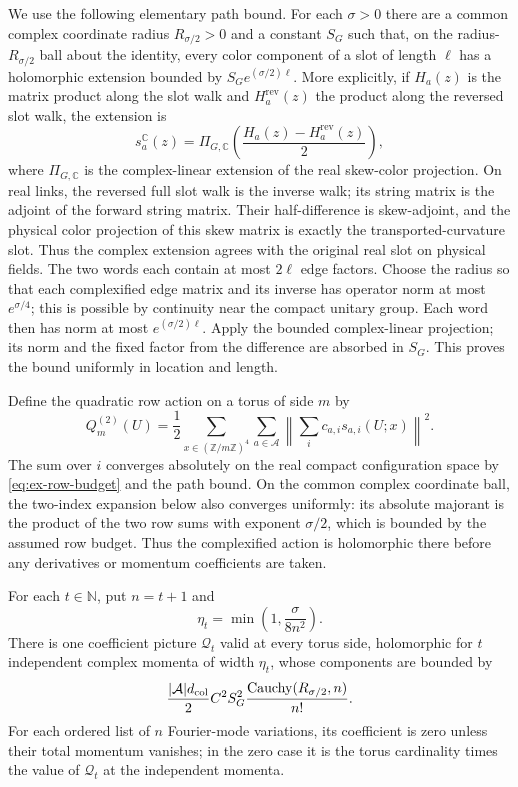 We use the following elementary path bound. For each $\sigma>0$ there are a
common complex coordinate radius $R_{\sigma/2}>0$ and a constant $S_G$ such
that, on the radius-$R_{\sigma/2}$ ball about the identity, every color
component of a slot of length $\ell$ has a holomorphic extension bounded by
$S_Ge^{(\sigma/2)\ell}$. More explicitly, if $H_a(z)$ is the matrix product along the slot walk and
$H_a^{\mathrm{rev}}(z)$ the product along the reversed slot walk, the
extension is
\[
 s_a^{\mathbb C}(z)=\Pi_{G,\mathbb C}\!\left(
       \frac{H_a(z)-H_a^{\mathrm{rev}}(z)}{2}\right),
\]
where $\Pi_{G,\mathbb C}$ is the complex-linear extension of the real
skew-color projection. On real links, the reversed full slot walk is the inverse walk; its string
matrix is the adjoint of the forward string matrix. Their half-difference is
skew-adjoint, and the physical color projection of this skew matrix is exactly
the transported-curvature slot. Thus the complex extension agrees with the
original real slot on physical fields. The two words each contain at most $2\ell$ edge
factors. Choose the radius so that each complexified edge matrix and its
inverse has operator norm at most $e^{\sigma/4}$; this is possible by
continuity near the compact unitary group. Each word then has norm at most
$e^{(\sigma/2)\ell}$. Apply the bounded complex-linear projection; its norm
and the fixed factor from the difference are absorbed in $S_G$. This proves
the bound uniformly in location and length.

Define the quadratic row action on a torus of side $m$ by
\[
 Q^{(2)}_m(U)=\frac12\sum_{x\in(\mathbb Z/m\mathbb Z)^4}
       \sum_{a\in\mathcal A}\left\|\sum_i c_{a,i}s_{a,i}(U;x)\right\|^2.
\]
The sum over $i$ converges absolutely on the real compact configuration
space by \eqref{eq:ex-row-budget} and the path bound. On the common complex
coordinate ball, the two-index expansion below also converges uniformly: its
absolute majorant is the product of the two row sums with exponent $\sigma/2$,
which is bounded by the assumed row budget. Thus the complexified action is
holomorphic there before any derivatives or momentum coefficients are taken.

\begin{proposition}
\label{prop:ex-row-quadratic-price}
For each $t\in\mathbb N$, put $n=t+1$ and
\[
 \eta_t=\min\!\left(1,\frac{\sigma}{8n^2}\right).
\]
There is one coefficient picture $\mathcal Q_t$ valid at every torus side,
holomorphic for $t$ independent complex momenta of width $\eta_t$, whose
components are bounded by
\[
 \frac{|\mathcal A|d_{\rm col}}{2}C^2S_G^2
       \frac{\operatorname{Cauchy}(R_{\sigma/2},n)}{n!}.
\]
For each ordered list of $n$ Fourier-mode variations, its coefficient is zero
unless their total momentum vanishes; in the zero case it is the torus
cardinality times the value of $\mathcal Q_t$ at the independent momenta.
\end{proposition}


